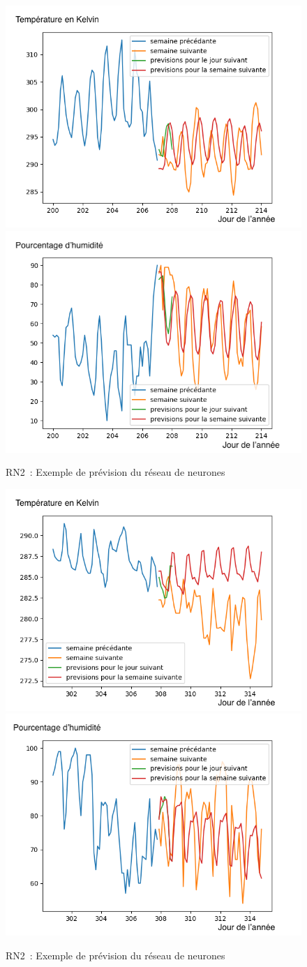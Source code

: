 \documentclass[11pt,a4paper]{article}
\begin{document}
\begin{figure} [H]
\centering
\includegraphics[width=0.48 \textwidth]{./imagesTIPE/imagesIA/dessinTempIA200.png}\quad
\includegraphics[width=0.48 \textwidth]{./imagesTIPE/imagesIA/dessinHumiIA200.png}
\caption{\label{fig:cosDS3} RN2~: Exemple de prévision du réseau de neurones}
\end{figure}
\begin{figure} [H]
\centering
\includegraphics[width=0.48 \textwidth]{./imagesTIPE/imagesIA/dessinTempIA300,75.png}\quad
\includegraphics[width=0.48 \textwidth]{./imagesTIPE/imagesIA/dessinHumiIA300,75.png}
\caption{\label{fig:cosDS} RN2~: Exemple de prévision du réseau de neurones}
\end{figure}
\end{document}
